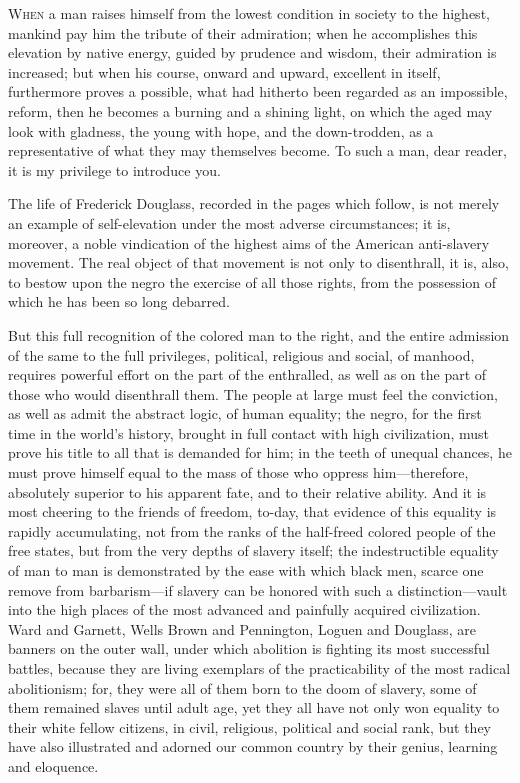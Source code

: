 \textsc{When} a man raises himself from the lowest condition in society
to the highest, mankind pay him the tribute of their admiration; when he
accomplishes this elevation by native energy, guided by prudence and
wisdom, their admiration is increased; but when his course, onward and
upward, excellent in itself, furthermore proves a possible, what had
hitherto been regarded as an impossible, reform, then he becomes a
burning and a shining light, on which the aged may look with gladness,
the young with hope, and the down-trodden, as a representative of what
they may themselves become. To such a man, dear reader, it is my
privilege to introduce you.

The life of Frederick Douglass, recorded in the pages which follow, is
not merely an example of self-elevation under the most adverse
circumstances; it is, moreover, a noble vindication of the highest aims
of the American anti-slavery movement. The real object of that movement
is not only to disenthrall, it is, also, to bestow upon the negro the
exercise of all those rights, from the possession of which he has been
so long debarred.

But this full recognition of the colored man to the right, and the
entire admission of the same to the full privileges, political,
religious and social, of manhood, requires powerful effort on the part
of the enthralled, as well as on the part of those who would disenthrall
them. The people at large must feel the conviction, as well as admit the
abstract logic, of human equality; the negro, for the first time in the
world's history, brought in full contact with high civilization, must
prove his title to all that is demanded for him; in the teeth of unequal
chances, he must prove himself equal to the mass of those who oppress
him---therefore, absolutely superior to his apparent fate, and to their
relative ability. And it is most cheering to the friends of freedom,
to-day, that evidence of this equality is
{\protect\hypertarget{xviii}{}{}}rapidly accumulating, not from the
ranks of the half-freed colored people of the free states, but from the
very depths of slavery itself; the indestructible equality of man to man
is demonstrated by the ease with which black men, scarce one remove from
barbarism---if slavery can be honored with such a distinction---vault
into the high places of the most advanced and painfully acquired
civilization. Ward and Garnett, Wells Brown and Pennington, Loguen and
Douglass, are banners on the outer wall, under which abolition is
fighting its most successful battles, because they are living exemplars
of the practicability of the most radical abolitionism; for, they were
all of them born to the doom of slavery, some of them remained slaves
until adult age, yet they all have not only won equality to their white
fellow citizens, in civil, religious, political and social rank, but
they have also illustrated and adorned our common country by their
genius, learning and eloquence.

